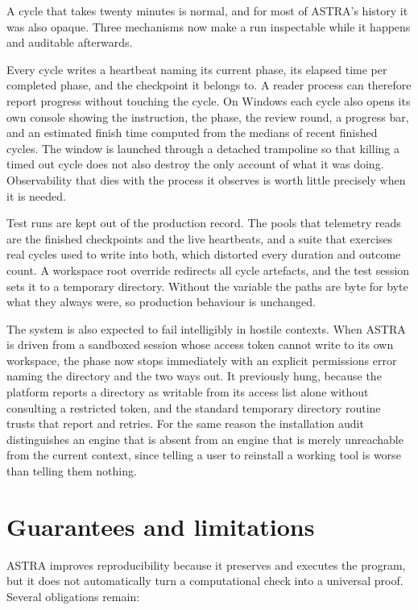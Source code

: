 \documentclass[11pt,a4paper]{article}
\begin{document}
A cycle that takes twenty minutes is normal, and for most of ASTRA's history it was also opaque. Three mechanisms now make a run inspectable while it happens and auditable afterwards.

Every cycle writes a heartbeat naming its current phase, its elapsed time per completed phase, and the checkpoint it belongs to. A reader process can therefore report progress without touching the cycle. On Windows each cycle also opens its own console showing the instruction, the phase, the review round, a progress bar, and an estimated finish time computed from the medians of recent finished cycles. The window is launched through a detached trampoline so that killing a timed out cycle does not also destroy the only account of what it was doing. Observability that dies with the process it observes is worth little precisely when it is needed.

Test runs are kept out of the production record. The pools that telemetry reads are the finished checkpoints and the live heartbeats, and a suite that exercises real cycles used to write into both, which distorted every duration and outcome count. A workspace root override redirects all cycle artefacts, and the test session sets it to a temporary directory. Without the variable the paths are byte for byte what they always were, so production behaviour is unchanged.

The system is also expected to fail intelligibly in hostile contexts. When ASTRA is driven from a sandboxed session whose access token cannot write to its own workspace, the phase now stops immediately with an explicit permissions error naming the directory and the two ways out. It previously hung, because the platform reports a directory as writable from its access list alone without consulting a restricted token, and the standard temporary directory routine trusts that report and retries. For the same reason the installation audit distinguishes an engine that is absent from an engine that is merely unreachable from the current context, since telling a user to reinstall a working tool is worse than telling them nothing.

\section{Guarantees and limitations}

ASTRA improves reproducibility because it preserves and executes the program, but it does not automatically turn a computational check into a universal proof. Several obligations remain:
\end{document}
